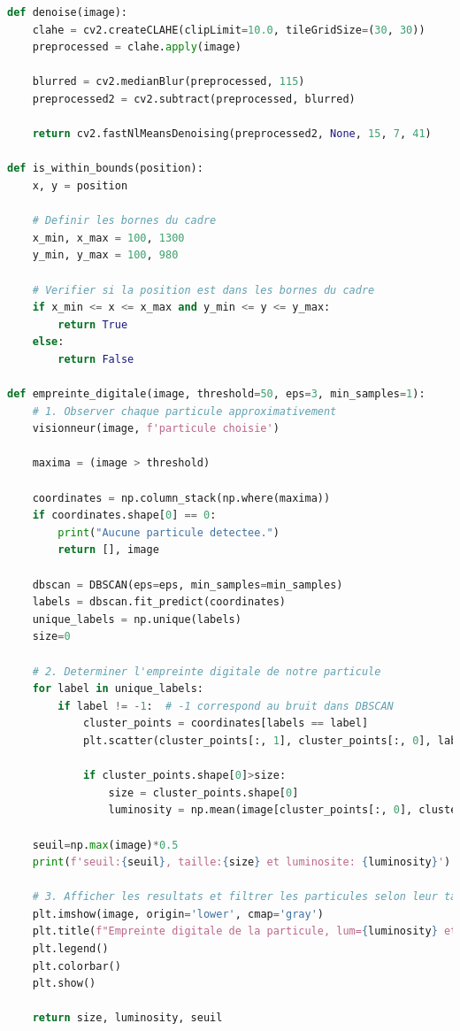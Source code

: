 \documentclass[11pt,letterpaper]{article}
\begin{document}
\begin{lstlisting}[language=python]
def denoise(image):
    clahe = cv2.createCLAHE(clipLimit=10.0, tileGridSize=(30, 30))
    preprocessed = clahe.apply(image)
    
    blurred = cv2.medianBlur(preprocessed, 115)
    preprocessed2 = cv2.subtract(preprocessed, blurred)
    
    return cv2.fastNlMeansDenoising(preprocessed2, None, 15, 7, 41)

def is_within_bounds(position):
    x, y = position

    # Definir les bornes du cadre
    x_min, x_max = 100, 1300
    y_min, y_max = 100, 980

    # Verifier si la position est dans les bornes du cadre
    if x_min <= x <= x_max and y_min <= y <= y_max:
        return True
    else:
        return False

def empreinte_digitale(image, threshold=50, eps=3, min_samples=1):
    # 1. Observer chaque particule approximativement
    visionneur(image, f'particule choisie')

    maxima = (image > threshold)
    
    coordinates = np.column_stack(np.where(maxima))  
    if coordinates.shape[0] == 0:
        print("Aucune particule detectee.")
        return [], image

    dbscan = DBSCAN(eps=eps, min_samples=min_samples)
    labels = dbscan.fit_predict(coordinates)
    unique_labels = np.unique(labels)
    size=0

    # 2. Determiner l'empreinte digitale de notre particule
    for label in unique_labels:
        if label != -1:  # -1 correspond au bruit dans DBSCAN
            cluster_points = coordinates[labels == label]
            plt.scatter(cluster_points[:, 1], cluster_points[:, 0], label=f'Particule {label}')

            if cluster_points.shape[0]>size:
                size = cluster_points.shape[0]
                luminosity = np.mean(image[cluster_points[:, 0], cluster_points[:, 1]])

    seuil=np.max(image)*0.5
    print(f'seuil:{seuil}, taille:{size} et luminosite: {luminosity}')

    # 3. Afficher les resultats et filtrer les particules selon leur taille et luminosite
    plt.imshow(image, origin='lower', cmap='gray')
    plt.title(f"Empreinte digitale de la particule, lum={luminosity} et taille={size}")
    plt.legend()
    plt.colorbar()  
    plt.show()

    return size, luminosity, seuil


\end{lstlisting}
\end{document}
